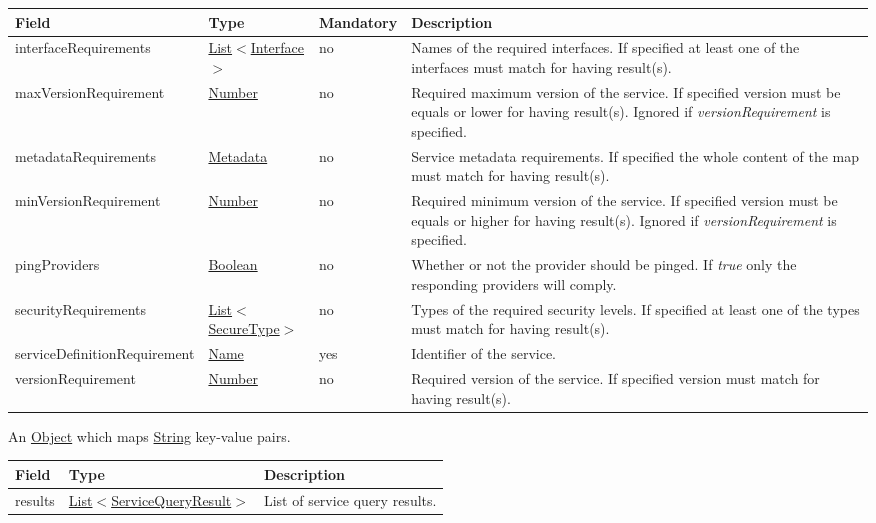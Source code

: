 \documentclass[a4paper]{arrowhead}
\newcommand{\pref}[1]{{\textcolor{ArrowheadGrey}{\hyperref[sec:model:primitives:#1]{#1}}}}
\begin{document}
\begin{table}[ht!]
\begin{tabularx}{\textwidth}{| p{5cm} | p{3cm} | p{2cm} | X |} \hline
\rowcolor{gray!33} Field & Type & Mandatory & Description \\ \hline
interfaceRequirements &\pref{List}$<$\pref{Interface}$>$ & no & Names of the required interfaces. If specified at least one of the interfaces must match for having result(s). \\ \hline
maxVersionRequirement &\pref{Number} & no & Required maximum version of the ser\-vice. If specified version must be equals or lower for having result(s). Ignored if \textit{versionRequirement} is specified. \\ \hline
metadataRequirements &\hyperref[sec:model:Metadata]{Metadata} & no & Service metadata requirements. If spe\-cified the whole content of
the map must match for having result(s). \\ \hline
minVersionRequirement &\pref{Number} & no & Required minimum version of the ser\-vice. If specified version must be equals or higher for having result(s). Ignored if \textit{versionRequirement} is specified. \\ \hline
pingProviders &\pref{Boolean} & no & Whether or not the provider should be pinged. If \textit{true} only the responding providers will comply. \\ \hline
securityRequirements &\pref{List}$<$\pref{SecureType}$>$ & no & Types of the required security levels. If specified at least one of the types must match for having result(s). \\ \hline
serviceDefinitionRequirement &\pref{Name} & yes & Identifier of the service. \\ \hline
versionRequirement &\pref{Number} & no & Required version of the service. If spe\-cified version must match for having result(s). \\ \hline
\end{tabularx}
\end{table}

\label{sec:model:Metadata}

An \pref{Object} which maps \pref{String} key-value pairs.

\label{sec:model:ServiceQueryResultList}

\begin{table}[ht!]
\begin{tabularx}{\textwidth}{| p{4.25cm} | p{4.5cm} | X |} \hline
\rowcolor{gray!33} Field & Type      & Description \\ \hline
results & \pref{List}$<$\hyperref[sec:model:ServiceQueryResult]{ServiceQueryResult}$>$     & List of service query results. \\ \hline
\end{tabularx}
\end{table}
\end{document}
